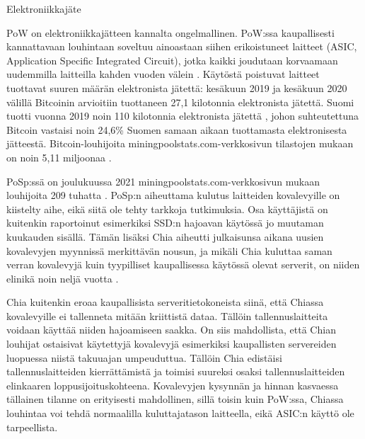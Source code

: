 \begin{section}{Elektroniikkajäte\label{elektroniikkajate}}

PoW on elektroniikkajätteen kannalta ongelmallinen. PoW:ssa kaupallisesti kannattavaan louhintaan soveltuu ainoastaan siihen erikoistuneet laitteet (ASIC, Application Specific Integrated Circuit), jotka kaikki joudutaan korvaamaan uudemmilla laitteilla kahden vuoden välein \cite{btc-carbon-ewaste}. Käytöstä poistuvat laitteet tuottavat suuren määrän elektronista jätettä: kesäkuun 2019 ja kesäkuun 2020 välillä Bitcoinin arvioitiin tuottaneen 27,1 kilotonnia elektronista jätettä. Suomi tuotti vuonna 2019 noin 110 kilotonnia elektronista jätettä \cite{ewaste-finland}, johon suhteutettuna Bitcoin vastaisi noin 24,6\% Suomen samaan aikaan tuottamasta elektronisesta jätteestä. Bitcoin-louhijoita miningpoolstats.com-verkkosivun tilastojen mukaan on noin 5,11 miljoonaa \cite{btc-pool-stats-miner-count}.

PoSp:ssä on joulukuussa 2021 miningpoolstats.com-verkkosivun mukaan louhijoita 209 tuhatta \cite{chia-pool-stats}. PoSp:n aiheuttama kulutus laitteiden kovalevyille on kiistelty aihe, eikä siitä ole tehty tarkkoja tutkimuksia. Osa käyttäjistä on kuitenkin raportoinut esimerkiksi SSD:n hajoavan käytössä jo muutaman kuukauden sisällä. Tämän lisäksi Chia aiheutti julkaisunsa aikana uusien kovalevyjen myynnissä merkittävän nousun, ja mikäli Chia kuluttaa saman verran kovalevyjä kuin tyypilliset kaupallisessa käytössä olevat serverit, on niiden elinikä noin neljä vuotta \cite{manufacturingcarbon1}.

Chia kuitenkin eroaa kaupallisista serveritietokoneista siinä, että Chiassa kovalevyille ei tallenneta mitään kriittistä dataa. Tällöin tallennuslaitteita voidaan käyttää niiden hajoamiseen saakka. On siis mahdollista, että Chian louhijat ostaisivat käytettyjä kovalevyjä esimerkiksi kaupallisten servereiden luopuessa niistä takuuajan umpeuduttua. Tällöin Chia edistäisi tallennuslaitteiden kierrättämistä ja toimisi suureksi osaksi tallennuslaitteiden elinkaaren loppusijoituskohteena. Kovalevyjen kysynnän ja hinnan kasvaessa tällainen tilanne on erityisesti mahdollinen, sillä toisin kuin PoW:ssa, Chiassa louhintaa voi tehdä normaalilla kuluttajatason laitteella, eikä ASIC:n käyttö ole tarpeellista.


\end{section}
